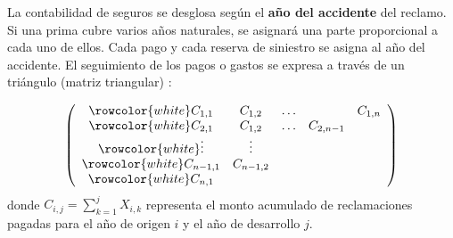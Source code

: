 \begin{f}
	
	La contabilidad de seguros se desglosa según el \textbf{año del accidente} del reclamo. 
	Si una prima cubre varios años naturales, se asignará una parte proporcional a cada uno de ellos.
	Cada pago y cada reserva de siniestro se asigna al año del accidente.
	El seguimiento de los pagos o gastos se expresa a través de un triángulo (matriz triangular) :
	
	\[
	\left(\begin{array}{ccccc}
		\rowcolor{white}	C_{1,1} & C_{1,2} & \ldots & & C_{1, n} \\
		\rowcolor{white}	C_{2,1} & C_{1,2} & \ldots & C_{2, n-1} \\
		\rowcolor{white}	\vdots & \vdots & & \\
		\rowcolor{white}	C_{n-1,1} & C_{n-1,2} & & \\
		\rowcolor{white}	C_{n, 1} & & &
	\end{array}\right)
	\]
	donde \(C_{i, j}=\sum_{k=1}^{j} X_{i, k}\) representa el monto acumulado de reclamaciones pagadas para el año de origen \(i\) y el año de desarrollo \(j\).
	
\end{f}


